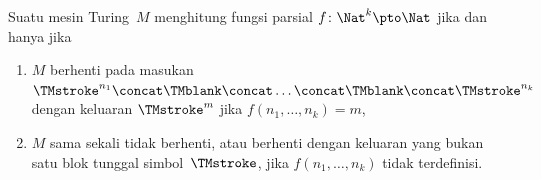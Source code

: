 \documentclass[../../../include/open-logic-section]{subfiles}
\begin{document}
\begin{defn}
  Suatu mesin Turing~$M$ menghitung fungsi parsial $f\colon \Nat^k
  \pto \Nat$ jika dan hanya jika
  \begin{enumerate}
    \item $M$ berhenti pada masukan $\TMstroke^{n_1}\concat\TMblank\concat
    \dots \concat\TMblank\concat\TMstroke^{n_k}$ dengan keluaran
    $\TMstroke^{m}$ jika $f(n_1, \dots, n_k) = m$,
    \item $M$ sama sekali tidak berhenti, atau berhenti dengan keluaran yang
    bukan satu blok tunggal simbol~$\TMstroke$, jika $f(n_1, \dots, n_k)$ tidak
    terdefinisi.
  \end{enumerate}
\end{defn}
\end{document}
